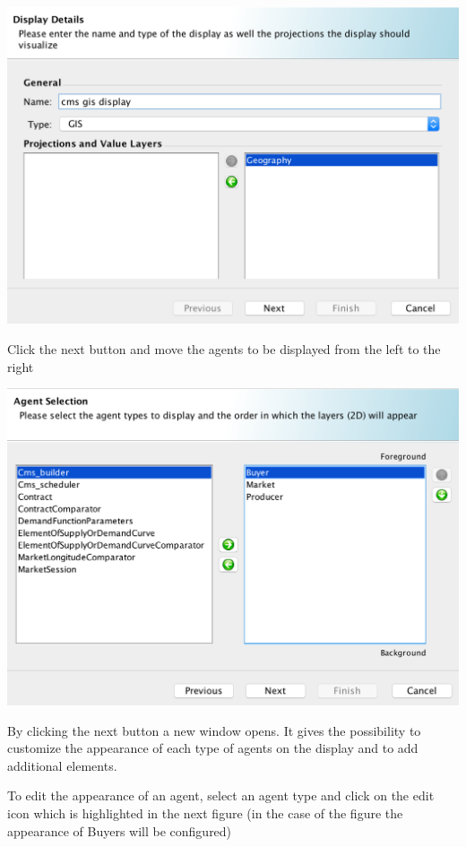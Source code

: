 \documentclass{article}
\begin{document}
\includegraphics[scale=0.35]{fig_cms_rs_gis2}

Click the next button and move the agents to be displayed from the left to the right

\includegraphics[scale=0.35]{fig_cms_rs_gis3}

By clicking the next button a new window opens. It gives the possibility to customize the appearance of each type of agents on the display and to add additional elements.

To edit the appearance of an agent, select an agent type and click on the edit icon which is highlighted in the next figure (in the case of the figure the appearance of Buyers will be configured)
\end{document}
